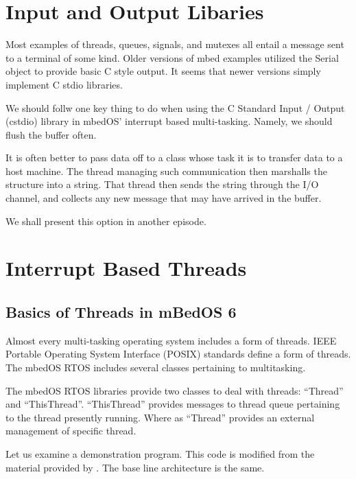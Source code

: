 \documentclass{article}
\begin{document}
\section{Input and Output Libaries} %
\label{sec:input_and_output_libaries}
Most examples of threads, queues, signals, and mutexes all entail a message sent to a terminal of some kind.  Older versions of mbed examples utilized the Serial object to provide basic C style output.  It seems that newer versions simply implement C stdio libraries.

We should follw one key thing to do when using the C Standard Input / Output (cstdio) library in mbedOS' interrupt based multi-tasking.  Namely, we should flush the buffer often.  

It is often better to pass data off to a class whose task it is to transfer data to a host machine.  The thread managing such communication then marshalls the structure into a string.  That thread then sends the string through the I/O channel, and collects any new message that may have arrived in the buffer.  

We shall present this option in another episode.


\section{Interrupt Based Threads} %
\label{sec:interrupt_based_threads}

\subsection{Basics of Threads in mBedOS 6} %
\label{sub:basics_of_threads_in_mbedos_6}
Almost every multi-tasking operating system includes a form of threads.  IEEE Portable Operating System Interface (POSIX) standards define a form of threads.  The mbedOS RTOS includes several classes pertaining to multitasking.  

The mbedOS RTOS libraries provide two classes to deal with threads: ``Thread'' and ``ThisThread''.  ``ThisThread'' provides messages to thread queue pertaining to the thread presently running.  Where as ``Thread'' provides an external management of specific thread. 

Let us examine a demonstration program.  This code is modified from the material provided by \cite{arm-based-microcontroller-mbed}.  The base line architecture is the same.  
\end{document}
